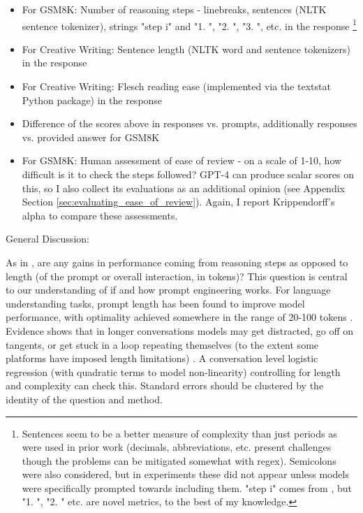 \documentclass[11pt]{article}
\begin{document}
\begin{itemize}
  \item For GSM8K: Number of reasoning steps - linebreaks, sentences (NLTK sentence tokenizer), strings "step i" and "1. ", "2. ", "3. ", etc. in the response \cite{fu_complexity-based_2023} \footnote{Sentences seem to be a better measure of complexity than just periods as were used in prior work (decimals, abbreviations, etc. present challenges though the problems can be mitigated somewhat with regex). Semicolons were also considered, but in experiments these did not appear unless models were specifically prompted towards including them. "step i" comes from \citealp{fu_complexity-based_2023}, but "1. ", "2. " etc. are novel metrics, to the best of my knowledge.}
  \item For Creative Writing: Sentence length (NLTK word and sentence tokenizers) in the response
  \item For Creative Writing: Flesch reading ease (implemented via the textstat Python package) in the response \cite{flesch_how_2016, aggarwal_textstat_nodate}
  \item Difference of the scores above in responses vs. prompts, additionally responses vs. provided answer for GSM8K
  \item For GSM8K: Human assessment of ease of review - on a scale of 1-10, how difficult is it to check the steps followed? GPT-4 can produce scalar scores on this, so I also collect its evaluations as an additional opinion (see Appendix Section \ref{sec:evaluating_ease_of_review}). Again, I report Krippendorff's alpha to compare these assessments. 
\end{itemize}

General Discussion:

As in \citealp{fu_complexity-based_2023}, are any gains in performance coming from reasoning steps as opposed to length (of the prompt or overall interaction, in tokens)? This question is central to our understanding of if and how prompt engineering works. For language understanding tasks, prompt length has been found to improve model performance, with optimality achieved somewhere in the range of 20-100 tokens \cite{lester_power_2021}. Evidence shows that in longer conversations models may get distracted, go off on tangents, or get stuck in a loop repeating themselves (to the extent some platforms have imposed length limitations) \cite{shi_large_2023, mann_microsoft_nodate}. A conversation level logistic regression (with quadratic terms to model non-linearity) controlling for length and complexity can check this. Standard errors should be clustered by the identity of the question and method.
\end{document}
